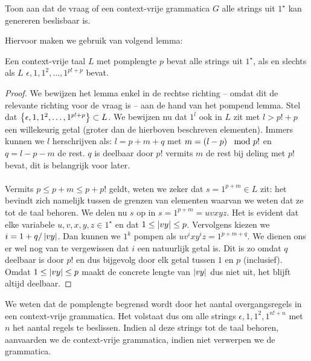 \documentclass[a4paper]{article}
\begin{document}
\begin{question}
Toon aan dat de vraag of een context-vrije grammatica $G$ alle strings uit $1^{\star}$ kan genereren beslisbaar is.
\begin{answer}
Hiervoor maken we gebruik van volgend lemma:
\begin{lemma}
Een context-vrije taal $L$ met pomplengte $p$ bevat alle strings uit $1^{\star}$, als en slechts als $L$ $\epsilon,1,1^2,\ldots,1^{p!+p}$ bevat.
\begin{proof}
We bewijzen het lemma enkel in de rechtse richting -- omdat dit de relevante richting voor de vraag is -- aan de hand van het pompend lemma. Stel dat $\left\{ \epsilon,1,1^2,\ldots,1^{p!+p} \right\}\subset L$. We bewijzen nu dat $1^l$ ook in $L$ zit met $l>p!+p$ een willekeurig getal (groter dan de hierboven beschreven elementen). Immers kunnen we $l$ herschrijven als: $l=p+m+q$ met $m=\left( l-p \right)\mod p!$ en $q=l-p-m$ de rest. $q$ is deelbaar door $p!$ vermits $m$ de rest bij deling met $p!$ bevat, dit is belangrijk voor later.
\paragraph{}
Vermits $p\leq p+m\leq p+p!$ geldt, weten we zeker dat $s=1^{p+m}\in L$ zit: het bevindt zich namelijk tussen de grenzen van elementen waarvan we weten dat ze tot de taal behoren. We delen nu $s$ op in $s=1^{p+m}=uvxyz$. Het is evident dat elke variabele $u,v,x,y,z\in 1^{\star}$ en dat $1\leq\left|vy\right|\leq p$. Vervolgens kiezen we $i=1+q/\left|vy\right|$. Dan kunnen we $1^k$ pompen als $uv^ixy^iz=1^{p+m+q}$. We dienen ons er wel nog van te vergewissen dat $i$ een natuurlijk getal is. Dit is zo omdat $q$ deelbaar is door $p!$ en dus bijgevolg door elk getal tussen $1$ en $p$ (inclusief). Omdat $1\leq\left|vy\right|\leq p$ maakt de concrete lengte van $\left|vy\right|$ dus niet uit, het blijft altijd deelbaar.
\end{proof}
\end{lemma}
We weten dat de pomplengte begrensd wordt door het aantal overgangsregels in een context-vrije grammatica. Het volstaat dus om alle strings $\epsilon,1,1^2,1^{n!+n}$ met $n$ het aantal regels te beslissen. Indien al deze strings tot de taal behoren, aanvaarden we de context-vrije grammatica, indien niet verwerpen we de grammatica.
\end{answer}
\end{question}
\end{document}
